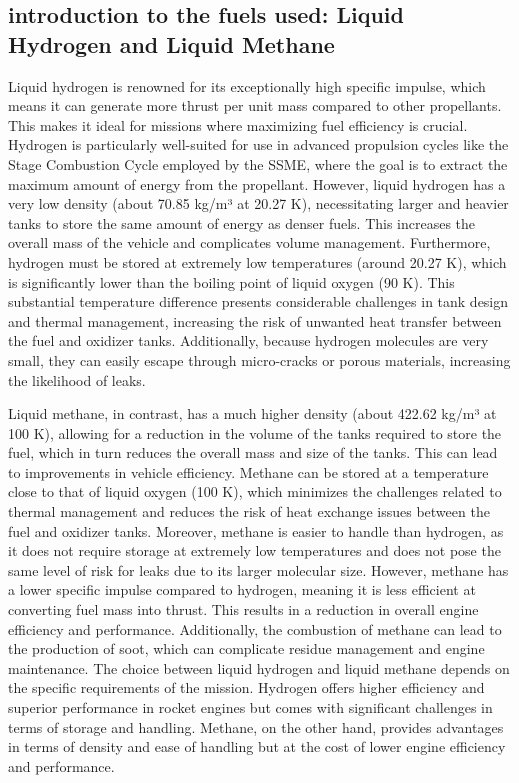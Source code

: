 \subsection{introduction to the fuels used: Liquid Hydrogen and Liquid Methane}
Liquid hydrogen is renowned for its exceptionally high specific impulse, which means it can generate more thrust per unit mass compared to other propellants.
This makes it ideal for missions where maximizing fuel efficiency is crucial. 
Hydrogen is particularly well-suited for use in advanced propulsion cycles like the Stage Combustion Cycle employed by the SSME, where the goal is to extract the maximum amount of energy from the propellant.
However, liquid hydrogen has a very low density (about 70.85 kg/m³ at 20.27 K), necessitating larger and heavier tanks to store the same amount of energy as denser fuels.
This increases the overall mass of the vehicle and complicates volume management.
Furthermore, hydrogen must be stored at extremely low temperatures (around 20.27 K), which is significantly lower than the boiling point of liquid oxygen (90 K).
This substantial temperature difference presents considerable challenges in tank design and thermal management, increasing the risk of unwanted heat transfer between the fuel and oxidizer tanks.
Additionally, because hydrogen molecules are very small, they can easily escape through micro-cracks or porous materials, increasing the likelihood of leaks.

Liquid methane, in contrast, has a much higher density (about 422.62 kg/m³ at 100 K), allowing for a reduction in the volume of the tanks required to store the fuel, which in turn reduces the overall mass and size of the tanks.
This can lead to improvements in vehicle efficiency.
Methane can be stored at a temperature close to that of liquid oxygen (100 K), which minimizes the challenges related to thermal management and reduces the risk of heat exchange issues between the fuel and oxidizer tanks.
Moreover, methane is easier to handle than hydrogen, as it does not require storage at extremely low temperatures and does not pose the same level of risk for leaks due to its larger molecular size.
However, methane has a lower specific impulse compared to hydrogen, meaning it is less efficient at converting fuel mass into thrust.
This results in a reduction in overall engine efficiency and performance. Additionally, the combustion of methane can lead to the production of soot, which can complicate residue management and engine maintenance.
The choice between liquid hydrogen and liquid methane depends on the specific requirements of the mission.
Hydrogen offers higher efficiency and superior performance in rocket engines but comes with significant challenges in terms of storage and handling.
Methane, on the other hand, provides advantages in terms of density and ease of handling but at the cost of lower engine efficiency and performance. 

